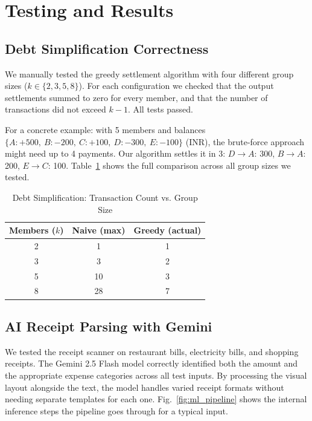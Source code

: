 \documentclass[conference]{IEEEtran}
\begin{document}
\section{Testing and Results}

\subsection{Debt Simplification Correctness}

We manually tested the greedy settlement algorithm with four different group sizes ($k \in \{2, 3, 5, 8\}$). For each configuration we checked that the output settlements summed to zero for every member, and that the number of transactions did not exceed $k-1$. All tests passed.

For a concrete example: with 5 members and balances $\{A: +500,\ B: -200,\ C: +100,\ D: -300,\ E: -100\}$ (INR), the brute-force approach might need up to 4 payments. Our algorithm settles it in 3: $D \rightarrow A$: 300, $B \rightarrow A$: 200, $E \rightarrow C$: 100. Table~\ref{tab:algo_results} shows the full comparison across all group sizes we tested.

\begin{table}[htbp]
  \caption{Debt Simplification: Transaction Count vs. Group Size}
  \begin{center}
    \begin{tabular}{|c|c|c|}
      \hline
      \textbf{Members ($k$)} & \textbf{Naive (max)} & \textbf{Greedy (actual)} \\
      \hline
      2 & 1 & 1 \\
      3 & 3 & 2 \\
      5 & 10 & 3 \\
      8 & 28 & 7 \\
      \hline
    \end{tabular}
    \label{tab:algo_results}
  \end{center}
\end{table}

\subsection{AI Receipt Parsing with Gemini}

We tested the receipt scanner on restaurant bills, electricity bills, and shopping receipts. The Gemini 2.5 Flash model correctly identified both the amount and the appropriate expense categories across all test inputs. By processing the visual layout alongside the text, the model handles varied receipt formats without needing separate templates for each one. Fig.~\ref{fig:ml_pipeline} shows the internal inference steps the pipeline goes through for a typical input.
\end{document}
